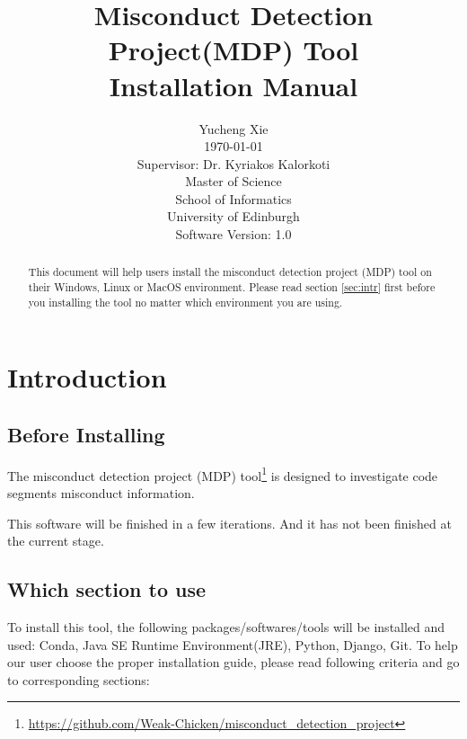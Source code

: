 \documentclass[twoside,a4paper]{refart}
\title{Misconduct Detection Project(MDP) Tool\\
Installation Manual}
\author{Yucheng Xie \\
\today \\
Supervisor: Dr. Kyriakos Kalorkoti\\
Master of Science\\
School of Informatics\\
University of Edinburgh\\
Software Version: 1.0}
\date{}
\begin{document}
\maketitle

\begin{abstract}
This document will help users install the misconduct detection project (MDP) tool on their Windows, Linux or MacOS environment. Please read section \ref{sec:intr} first before you installing the tool no matter which environment you are using.
\end{abstract}

\tableofcontents

\newpage



\section{Introduction} \label{sec:intr}

\subsection{Before Installing} \label{subsec:befo}
The misconduct detection project (MDP) tool\footnote{\url{https://github.com/Weak-Chicken/misconduct_detection_project}} is designed to investigate code segments misconduct information.

This software will be finished in a few iterations. And it has not been finished at the current stage.

\subsection{Which section to use}
To install this tool, the following packages/softwares/tools will be installed and used: Conda, Java SE Runtime Environment(JRE), Python, Django, Git. To help our user choose the proper installation guide, please read following criteria and go to corresponding sections:
\end{document}
